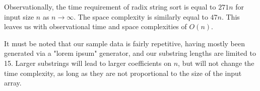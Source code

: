 \documentclass[12pt]{amsart}
\begin{document}
    Observationally, the time requirement of radix string sort
    is equal to $271n$ for input size $n$ as $n \to \infty$. The
    space complexity is similarly equal to $47n$. This leaves
    us with observational time and space complexities of $O(n)$.

    It must be noted that our sample data is fairly repetitive,
    having mostly been generated via a "lorem ipsum" generator,
    and our substring lengths are limited to 15. Larger
    substrings will lead to larger coefficients on $n$, but will
    not change the time complexity, as long as they are not
    proportional to the size of the input array.
\end{document}
